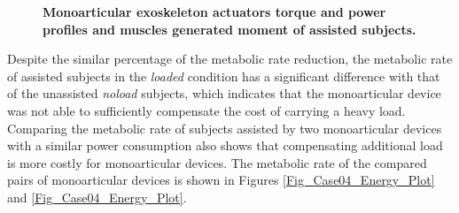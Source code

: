 \documentclass[10pt,letterpaper]{article}
\begin{document}
\begin{figure}[ht!]
	\centering
	\hfil
	\vspace{1mm}
	\caption{\small{\textbf{Monoarticular exoskeleton actuators torque and power profiles and muscles generated moment of assisted subjects.} }}
	\label{Fig_Case04_Profiles}
\end{figure}
Despite the similar percentage of the metabolic rate reduction, the metabolic rate of assisted subjects in the {\it loaded} condition has a significant difference with that of the unassisted {\it noload} subjects, which indicates that the monoarticular device was not able to sufficiently compensate the cost of carrying a heavy load. Comparing the metabolic rate of subjects assisted by two monoarticular devices with a similar power consumption also shows that compensating additional load is more costly for monoarticular devices. The metabolic rate of the compared pairs of monoarticular devices is shown in Figures \ref{Fig_Case04_Energy_Plot} and \ref{Fig_Case04_Energy_Plot}. 
\end{document}
